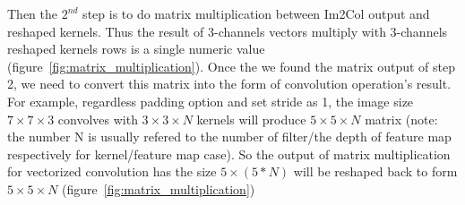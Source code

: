 Then the $2^{nd}$ step is to do matrix multiplication between Im2Col output and reshaped kernels. Thus the result of 3-channels vectors multiply with 3-channels reshaped kernels rows is a single numeric value (figure~\ref{fig:matrix_multiplication}). Once the we found the matrix output of step 2, we need to convert this matrix into the form of convolution operation's result. For example, regardless padding option and set stride as 1, the image size $7\times7\times 3$ convolves with $3\times 3 \times N$ kernels will produce $5\times 5 \times N$ matrix (note: the number N is usually refered to the number of filter/the depth of feature map respectively for kernel/feature map case). So the output of matrix multiplication for vectorized convolution has the size $5\times(5*N)$ will be reshaped back to form $5\times 5 \times N$ (figure~\ref{fig:matrix_multiplication})



